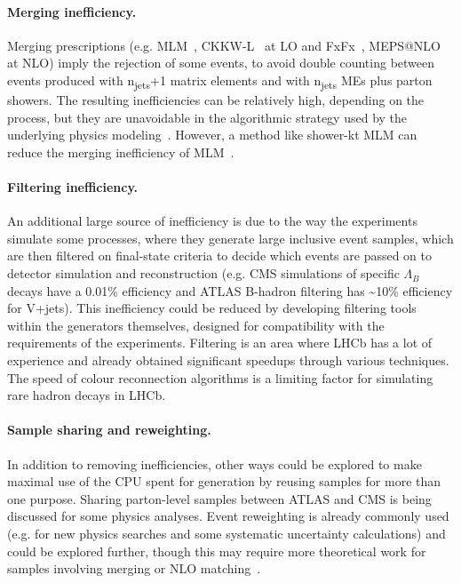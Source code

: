 \paragraph{Merging inefficiency.} Merging prescriptions (e.g. MLM~\cite{Man02},
CKKW-L~\cite{Lon02} at LO and FxFx~\cite{Fre12}, MEPS@NLO~\cite{Hoe14} at
NLO) imply the rejection of some events, to avoid double counting
between events produced with n\textsubscript{jets}+1 matrix elements and
with n\textsubscript{jets} MEs plus parton showers. The resulting
inefficiencies can be relatively high, depending on the process, but they
are unavoidable in the algorithmic strategy used by the underlying
physics modeling~\cite{Alw08}. However, a method like shower-kt MLM can
reduce the merging inefficiency of MLM~\cite{Alw09}.

\paragraph{Filtering inefficiency.} An additional large source of inefficiency
is due to the way the experiments simulate some processes, where they
generate large inclusive event samples, which are then filtered on
final-state criteria to decide which events are passed on to detector
simulation and reconstruction (e.g. CMS simulations of specific
$\Lambda_{B}$ decays have a 0.01\% efficiency and ATLAS B-hadron
filtering has \textasciitilde10\% efficiency for V+jets). This
inefficiency could be reduced by developing filtering tools within the
generators themselves, designed for compatibility with the requirements
of the experiments. Filtering is an area where LHCb has a lot of
experience and already obtained significant speedups through various
techniques. The speed of colour reconnection algorithms is a limiting
factor for simulating rare hadron decays in LHCb.

\paragraph{Sample sharing and reweighting.} In addition to removing
inefficiencies, other ways could be explored to make maximal use of the
CPU spent for generation by reusing samples for more than one purpose.
Sharing parton-level samples between ATLAS and CMS is being discussed
for some physics analyses. Event reweighting is already commonly used
(e.g. for new physics searches and some systematic uncertainty
calculations) and could be explored further, though this may require
more theoretical work for samples involving merging or NLO matching~\cite{Mat16}.

